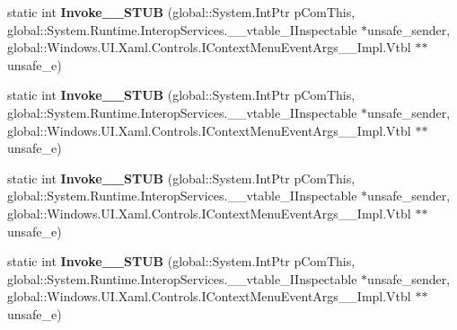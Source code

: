 \begin{DoxyCompactItemize}
\item 
\mbox{\label{struct_windows_1_1_u_i_1_1_xaml_1_1_controls_1_1_context_menu_opening_event_handler_____impl_1_1_vtbl_a5993dd6406aa5ec378bcd75a82cffe2c}} 
static int {\bfseries Invoke\+\_\+\+\_\+\+S\+T\+UB} (global\+::\+System.\+Int\+Ptr p\+Com\+This, global\+::\+System.\+Runtime.\+Interop\+Services.\+\_\+\+\_\+vtable\+\_\+\+I\+Inspectable $\ast$unsafe\+\_\+sender, global\+::\+Windows.\+U\+I.\+Xaml.\+Controls.\+I\+Context\+Menu\+Event\+Args\+\_\+\+\_\+\+Impl.\+Vtbl $\ast$$\ast$unsafe\+\_\+e)
\item 
\mbox{\label{struct_windows_1_1_u_i_1_1_xaml_1_1_controls_1_1_context_menu_opening_event_handler_____impl_1_1_vtbl_a5993dd6406aa5ec378bcd75a82cffe2c}} 
static int {\bfseries Invoke\+\_\+\+\_\+\+S\+T\+UB} (global\+::\+System.\+Int\+Ptr p\+Com\+This, global\+::\+System.\+Runtime.\+Interop\+Services.\+\_\+\+\_\+vtable\+\_\+\+I\+Inspectable $\ast$unsafe\+\_\+sender, global\+::\+Windows.\+U\+I.\+Xaml.\+Controls.\+I\+Context\+Menu\+Event\+Args\+\_\+\+\_\+\+Impl.\+Vtbl $\ast$$\ast$unsafe\+\_\+e)
\item 
\mbox{\label{struct_windows_1_1_u_i_1_1_xaml_1_1_controls_1_1_context_menu_opening_event_handler_____impl_1_1_vtbl_a5993dd6406aa5ec378bcd75a82cffe2c}} 
static int {\bfseries Invoke\+\_\+\+\_\+\+S\+T\+UB} (global\+::\+System.\+Int\+Ptr p\+Com\+This, global\+::\+System.\+Runtime.\+Interop\+Services.\+\_\+\+\_\+vtable\+\_\+\+I\+Inspectable $\ast$unsafe\+\_\+sender, global\+::\+Windows.\+U\+I.\+Xaml.\+Controls.\+I\+Context\+Menu\+Event\+Args\+\_\+\+\_\+\+Impl.\+Vtbl $\ast$$\ast$unsafe\+\_\+e)
\item 
\mbox{\label{struct_windows_1_1_u_i_1_1_xaml_1_1_controls_1_1_context_menu_opening_event_handler_____impl_1_1_vtbl_a5993dd6406aa5ec378bcd75a82cffe2c}} 
static int {\bfseries Invoke\+\_\+\+\_\+\+S\+T\+UB} (global\+::\+System.\+Int\+Ptr p\+Com\+This, global\+::\+System.\+Runtime.\+Interop\+Services.\+\_\+\+\_\+vtable\+\_\+\+I\+Inspectable $\ast$unsafe\+\_\+sender, global\+::\+Windows.\+U\+I.\+Xaml.\+Controls.\+I\+Context\+Menu\+Event\+Args\+\_\+\+\_\+\+Impl.\+Vtbl $\ast$$\ast$unsafe\+\_\+e)

\end{DoxyCompactItemize}
